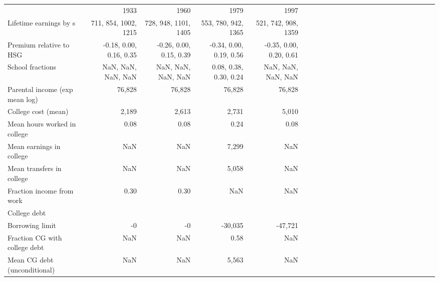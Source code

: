 \begin{tabular}{lrrrrrrrrrrrrrrrrrrrrrrr}
\hline
 & 1933  & 1960  & 1979  & 1997  &   &   &   &   &   &   &   &   &   &   &   &   &   &   &   &   &   &   &   \\ 
Lifetime earnings by s & 711, 854, 1002, 1215  & 728, 948, 1101, 1405  & 553, 780, 942, 1365  & 521, 742, 908, 1359  &   &   &   &   &   &   &   &   &   &   &   &   &   &   &   &   &   &   &   \\ 
Premium relative to HSG & -0.18, 0.00, 0.16, 0.35  & -0.26, 0.00, 0.15, 0.39  & -0.34, 0.00, 0.19, 0.56  & -0.35, 0.00, 0.20, 0.61  &   &   &   &   &   &   &   &   &   &   &   &   &   &   &   &   &   &   &   \\ 
School fractions & NaN, NaN, NaN, NaN  & NaN, NaN, NaN, NaN  & 0.08, 0.38, 0.30, 0.24  & NaN, NaN, NaN, NaN  &   &   &   &   &   &   &   &   &   &   &   &   &   &   &   &   &   &   &   \\ 
Parental income (exp mean log) & 76,828  & 76,828  & 76,828  & 76,828  &   &   &   &   &   &   &   &   &   &   &   &   &   &   &   &   &   &   &   \\ 
College cost (mean) & 2,189  & 2,613  & 2,731  & 5,010  &   &   &   &   &   &   &   &   &   &   &   &   &   &   &   &   &   &   &   \\ 
Mean hours worked in college & 0.08  & 0.08  & 0.24  & 0.08  &   &   &   &   &   &   &   &   &   &   &   &   &   &   &   &   &   &   &   \\ 
Mean earnings in college & NaN  & NaN  & 7,299  & NaN  &   &   &   &   &   &   &   &   &   &   &   &   &   &   &   &   &   &   &   \\ 
Mean transfers in college & NaN  & NaN  & 5,058  & NaN  &   &   &   &   &   &   &   &   &   &   &   &   &   &   &   &   &   &   &   \\ 
Fraction income from work & 0.30  & 0.30  & NaN  & NaN  &   &   &   &   &   &   &   &   &   &   &   &   &   &   &   &   &   &   &   \\ 
College debt &   &   &   &   &   &   &   &   &   &   &   &   &   &   &   &   &   &   &   &   &   &   &   \\ 
Borrowing limit & -0  & -0  & -30,035  & -47,721  &   &   &   &   &   &   &   &   &   &   &   &   &   &   &   &   &   &   &   \\ 
Fraction CG with college debt & NaN  & NaN  & 0.58  & NaN  &   &   &   &   &   &   &   &   &   &   &   &   &   &   &   &   &   &   &   \\ 
Mean CG debt (unconditional) & NaN  & NaN  & 5,563  & NaN  &   &   &   &   &   &   &   &   &   &   &   &   &   &   &   &   &   &   &   \\ 
\hline
\end{tabular}%
